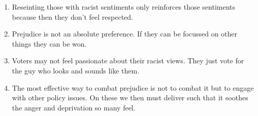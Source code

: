 \documentclass[a4paper, twocolumn]{article}
\begin{document}
\begin{enumerate}
	\item Reseinting those with racist sentiments only reinforces those sentiments because then they don't feel respected.
	\item Prejudice is not an absolute preference. If they can be focussed on other things they can be won.
	\item Voters may not feel passionate about their racist views. They just vote for the guy who looks and sounds like them.
	\item The most effective way to combat prejudice is not to combat it but to engage with other policy issues. On these we then must deliver such that it soothes the anger and deprivation so many feel.
\end{enumerate}


\onecolumn{
{}

}
\end{document}
